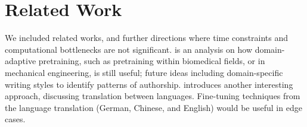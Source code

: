 \documentclass[11pt]{article}
\begin{document}
\begin{table}[ht]
\centering
\caption{Report for \texttt{german\_wikipedia.jsonl}}
\label{tab:german_wikipedia}
\end{table}

\begin{table}[ht]
\centering
\caption{Report for \texttt{toefl.json}}
\label{tab:toefl}
\end{table}



\section{Related Work}
\label{sec:related_work}

We included related works, and further directions where time constraints and computational bottlenecks are not significant. \cite{gururangan-etal-2020-dont} is an analysis on how domain-adaptive pretraining, such as pretraining within biomedical fields, or in mechanical engineering, is still useful;  future ideas including domain-specific writing styles to identify patterns of authorship. \cite{jiao-etal-2021-self} introduces another interesting approach, discussing translation between languages. Fine-tuning techniques from the language translation (German, Chinese, and English) would be useful in edge cases. 
\end{document}
